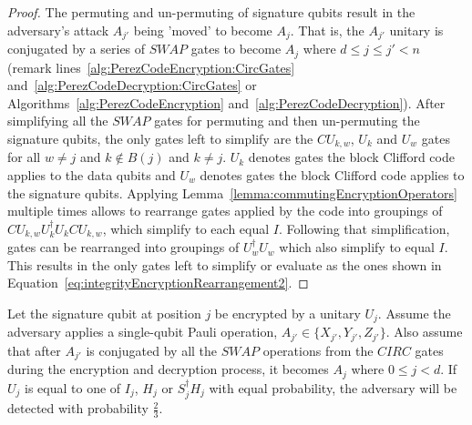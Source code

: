 \begin{proof}
The permuting and un-permuting of signature qubits result in the adversary's attack $A_{j'}$ being 'moved' to become $A_j$. That is, the $A_{j'}$ unitary is conjugated by a series of $\mathit{SWAP}$ gates to become $A_{j}$ where $d \leq j \leq j' < n$ (remark lines~\ref{alg:PerezCodeEncryption:CircGates} and~\ref{alg:PerezCodeDecryption:CircGates} or Algorithms~\ref{alg:PerezCodeEncryption} and~\ref{alg:PerezCodeDecryption}). After simplifying all the $\mathit{SWAP}$ gates for permuting and then un-permuting the signature qubits, the only gates left to simplify are the $\mathit{CU}_{k,w}$, $U_k$ and $U_w$ gates for all $w \neq j$ and $k \notin B(j)$ and $k \neq j$. $U_k$ denotes gates the block Clifford code applies to the data qubits and $U_w$ denotes gates the block Clifford code applies to the signature qubits. Applying Lemma~\ref{lemma:commutingEncryptionOperators} multiple times allows to rearrange gates applied by the code into groupings of  $\mathit{CU}_{k,w}U_k^{\dagger}U_k\mathit{CU}_{k,w}$, which simplify to each equal $I$.  Following that simplification, gates can be rearranged into groupings of $U_w^{\dagger}U_w$ which also simplify to equal $I$. This results in the only gates left to simplify or evaluate as the ones shown in Equation~\eqref{eq:integrityEncryptionRearrangement2}.
\end{proof}
\begin{theorem}
\label{theorem:singleQubitAttackOnSignatureQubit}
Let the signature qubit at position $j$ be encrypted by a unitary $U_j$. Assume the adversary applies a single-qubit Pauli operation, $A_{j'} \in \{X_{j'}, Y_{j'}, Z_{j'}\}$. Also assume that after $A_{j'}$ is conjugated by all the $\mathit{SWAP}$ operations from the $\mathit{CIRC}$ gates during the encryption and decryption process, it becomes $A_j$ where $0 \leq j < d$. If $U_j$ is equal to one of $I_j$, $H_j$ or $S_j^{\dagger}H_j$ with equal probability, the adversary will be detected with probability $\frac{2}{3}$.
\end{theorem}
